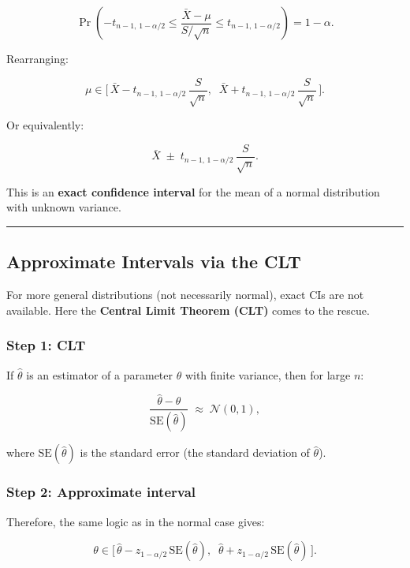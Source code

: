 \documentclass[
  letterpaper,
  DIV=11,
  numbers=noendperiod]{scrreprt}
\theoremstyle{definition}
\theoremstyle{plain}
\theoremstyle{definition}
\theoremstyle{remark}
\begin{document}
\[
\Pr\!\left(-t_{n-1,\,1-\alpha/2} \leq \frac{\bar{X}-\mu}{S/\sqrt{n}} \leq t_{n-1,\,1-\alpha/2}\right) = 1-\alpha.
\]

Rearranging:

\[
\mu \in \biggl[\,\bar{X} - t_{n-1,\,1-\alpha/2}\,\frac{S}{\sqrt{n}}, \;\; \bar{X} + t_{n-1,\,1-\alpha/2}\,\frac{S}{\sqrt{n}} \,\biggr].
\]

Or equivalently:

\[
\bar{X} \;\pm\; t_{n-1,\,1-\alpha/2}\,\frac{S}{\sqrt{n}}.
\]

This is an \textbf{exact confidence interval} for the mean of a normal
distribution with unknown variance.

\begin{center}\rule{0.5\linewidth}{0.5pt}\end{center}

\subsection{Approximate Intervals via the
CLT}\label{approximate-intervals-via-the-clt}

For more general distributions (not necessarily normal), exact CIs are
not available. Here the \textbf{Central Limit Theorem (CLT)} comes to
the rescue.

\subsubsection{Step 1: CLT}\label{step-1-clt}

If \(\hat{\theta}\) is an estimator of a parameter \(\theta\) with
finite variance, then for large \(n\):

\[
\frac{\hat{\theta} - \theta}{\text{SE}(\hat{\theta})} \;\approx\; \mathcal{N}(0,1),
\]

where \(\text{SE}(\hat{\theta})\) is the standard error (the standard
deviation of \(\hat{\theta}\)).

\subsubsection{Step 2: Approximate
interval}\label{step-2-approximate-interval}

Therefore, the same logic as in the normal case gives:

\[
\theta \in \biggl[\,\hat{\theta} - z_{1-\alpha/2}\,\text{SE}(\hat{\theta}), \;\; \hat{\theta} + z_{1-\alpha/2}\,\text{SE}(\hat{\theta}) \,\biggr].
\]
\end{document}
